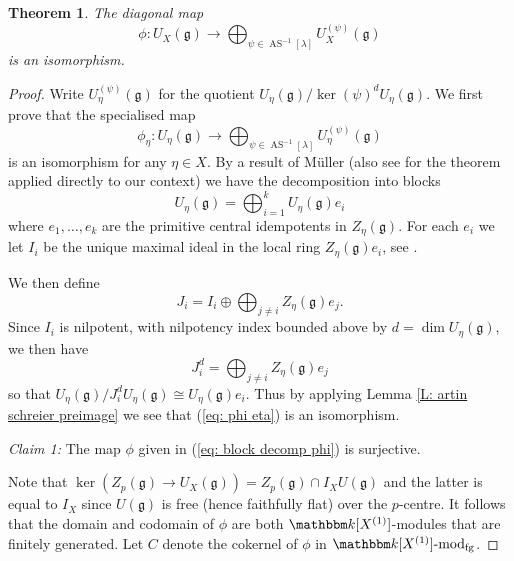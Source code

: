 \documentclass[twoside,12pt,reqno]{amsart}
\newtheorem{Theorem}{Theorem}[section]
\theoremstyle{remark}
\numberwithin{equation}{section}
\def\k{{\mathbbm k}}
\def\lmod{\!\operatorname{-mod}}
\def\g{{\mathfrak g}}
\newcommand{\AS}{\operatorname{AS}}
\newcommand{\fg}{\operatorname{fg}}
\begin{document}
\begin{Theorem} \label{T:blockdecomp}
    The diagonal map
    \begin{equation} \label{eq: block decomp phi}
        \phi \colon U_X(\g) \to \bigoplus_{\psi \in \AS^{-1}[\lambda]} U_X^{(\psi)} (\g)
    \end{equation}
    is an isomorphism.
\end{Theorem}

\begin{proof}
   Write $U_\eta^{(\psi)}(\g)$ for the quotient $U_\eta(\g)/\ker(\psi)^dU_\eta(\g)$. We first prove that the specialised map
\begin{equation} \label{eq: phi eta}
    \phi_\eta \colon U_\eta(\g) \to \bigoplus_{\psi \in \AS^{-1}[\lambda]} U_\eta^{(\psi)}(\g) 
\end{equation}
is an isomorphism for any $\eta\in X$.
By a result of M\"{u}ller \cite[Theorem 7]{Muller} (also see \cite[2.10]{Brown Gordon} for the theorem applied directly to our context) we have the decomposition into blocks
\begin{equation}
    U_\eta(\g) = \bigoplus_{i=1}^k U_\eta(\g) e_i
\end{equation}
where $e_1, \ldots, e_k$ are the primitive central idempotents in $Z_\eta(\g)$.
For each $e_i$ we let $I_i$ be the unique maximal ideal in the local ring $Z_\eta(\g) e_i$, see \cite[Theorem 8.7]{AM}.

We then define
\begin{equation}
    J_i = I_i \oplus \bigoplus_{j \neq i} Z_\eta(\g) e_j.
\end{equation}
Since $I_i$ is nilpotent, with nilpotency index bounded above by $d = \dim U_\eta(\g)$, we then have
\begin{equation}
    J_i^d = \bigoplus_{j \neq i} Z_\eta(\g) e_j
\end{equation}
so that $U_\eta(\g) / J_i^d U_\eta(\g) \cong U_\eta(\g) e_i$.
Thus by applying Lemma \ref{L: artin schreier preimage} we see that (\ref{eq: phi eta}) is an isomorphism.

{\it Claim 1:}    The map $\phi$ given in (\ref{eq: block decomp phi}) is surjective.

    Note that $\ker(Z_p(\g) \to U_X(\g)) = Z_p(\g) \cap I_X U(\g)$ and the latter is equal to $I_X$ since $U(\g)$ is free (hence faithfully flat) over the $p$-centre.
    It follows that the domain and codomain of $\phi$ are both $\k[X^{(1)}]$-modules that are finitely generated. Let $C$ denote the cokernel of $\phi$ in $\k[X^{(1)}]\lmod_{\fg}$.    


\end{proof}
\end{document}
